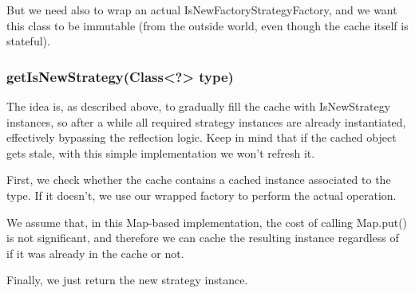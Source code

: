 \documentclass[11pt]{article}
\begin{document}
But we need also to wrap an actual IsNewFactoryStrategyFactory, and we want this class to be immutable (from the outside world, even
though the cache itself is stateful).

\subsubsection{getIsNewStrategy(Class<?> type)}
\label{sec-1-1-1}

The idea is, as described above, to gradually fill the cache with IsNewStrategy instances, so after
a while all required strategy instances are already instantiated, effectively bypassing the reflection logic.
Keep in mind that if the cached object gets stale, with this simple implementation we won't refresh it.

First, we check whether the cache contains a cached instance associated to the type. If it doesn't, we use
our wrapped factory to perform the actual operation.

We assume that, in this Map-based implementation, the cost of calling Map.put() is not significant, and therefore
we can cache the resulting instance regardless of if it was already in the cache or not.

Finally, we just return the new strategy instance.
\end{document}
